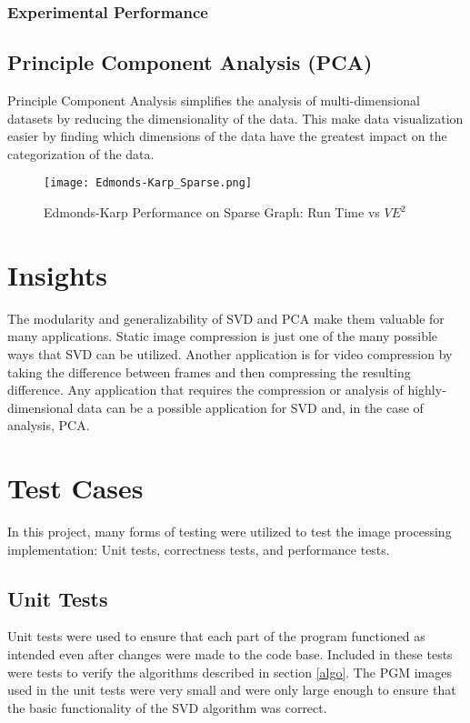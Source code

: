 \documentclass[conference]{IEEEtran}
\begin{document}
\subsubsection{Experimental Performance}



\subsection{Principle Component Analysis (PCA)}
Principle Component Analysis simplifies the analysis of multi-dimensional datasets by 
reducing the dimensionality of the data. This make data visualization easier by finding
which dimensions of the data have the greatest impact on the categorization of the data. 


\begin{figure}
	\centering
	\texttt{[image: Edmonds-Karp\_Sparse.png]}
	\caption{Edmonds-Karp Performance on Sparse Graph: Run Time vs $VE^2$}
	\label{ff_perf_sparse}
\end{figure}


\section{Insights}
The modularity and generalizability of SVD and PCA make them valuable for 
many applications. Static image compression is just one of the many possible
ways that SVD can be utilized. Another application is for video compression by
taking the difference between frames and then compressing the resulting difference.
Any application that requires the compression or analysis of highly-dimensional data
can be a possible application for SVD and, in the case of analysis, PCA. 


\section{Test Cases}
In this project, many forms of testing were utilized to test the image processing implementation: Unit tests, correctness tests,
and performance tests.

\subsection{Unit Tests}
Unit tests were used to ensure that each part of the program functioned as intended even after
changes were made to the code base. Included in these tests were tests to verify the algorithms
described in section \ref{algo}. The PGM images used in the unit tests were very small and were
only large enough to ensure that the basic functionality of the SVD algorithm was correct.  
\end{document}
